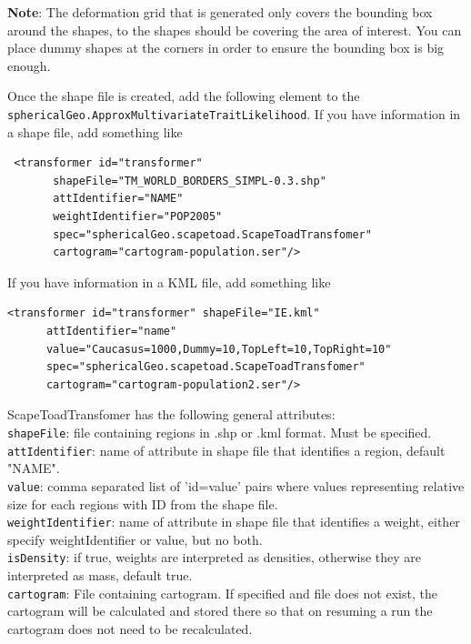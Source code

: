 \documentclass{article}
\begin{document}
{\bf Note}: The deformation grid that is generated only covers the bounding box around the shapes, to the shapes should be covering the area of interest. You can place dummy shapes at the corners in order to ensure the bounding box is big enough.

Once the shape file is created, add the following element to the {\tt sphericalGeo.ApproxMultivariateTraitLikelihood}.
If you have information in a shape file, add something like

\begin{verbatim}
 <transformer id="transformer" 
       shapeFile="TM_WORLD_BORDERS_SIMPL-0.3.shp" 
       attIdentifier="NAME" 
       weightIdentifier="POP2005" 
       spec="sphericalGeo.scapetoad.ScapeToadTransfomer"
       cartogram="cartogram-population.ser"/> 
 \end{verbatim}

If you have information in a KML file, add something like

\begin{verbatim}
<transformer id="transformer" shapeFile="IE.kml"
      attIdentifier="name"
      value="Caucasus=1000,Dummy=10,TopLeft=10,TopRight=10"
      spec="sphericalGeo.scapetoad.ScapeToadTransfomer"
      cartogram="cartogram-population2.ser"/>
\end{verbatim}

ScapeToadTransfomer has the following general attributes:\\

{\tt shapeFile}: file containing regions in .shp or .kml format. Must be specified.\\

{\tt attIdentifier}: name of attribute in shape file that identifies a region, default "NAME".\\

{\tt value}: comma separated list of 'id=value' pairs where values representing relative size for each regions with ID from the shape file.\\

{\tt weightIdentifier}: name of attribute in shape file that identifies a weight, either specify weightIdentifier or value, but no both.\\

{\tt isDensity}: if true, weights are interpreted as densities, otherwise they are interpreted as mass, default true.\\

{\tt cartogram}: File containing cartogram. If specified and file does not exist, the cartogram will be calculated and stored there so that on resuming a run the cartogram does not need to be recalculated.\\
\end{document}

